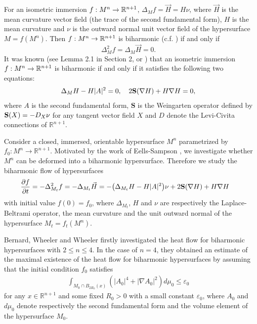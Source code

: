\documentclass{amsart}
\theoremstyle{definition}
\numberwithin{equation}{section}
\begin{document}
 For  an isometric
immersion $f: M^n\to
 \Bbb R^{n+1}$,  $ \Delta_{M} f=\vec H=H \nu$, where $\vec H$ is  the mean curvature vector field (the trace  of the second fundamental form),
 $H$ is the mean curvature and  $\nu$ is the outward normal  unit vector  field
of the hypersurface $M=f(M^n)$. Then  $f:
M^n\rightarrow \Bbb R^{n+1}$ is   biharmonic (c.f. \cite{Chen1991})  if and only if
\begin{equation}\label{Bi Map2}
\Delta_{M}^2f=\Delta_{M} \vec{H}=0.
\end{equation}
 It was known (see Lemma 2.1 in Section 2, or \cite{Chen1991}) that
	an isometric immersion $f: M^n\rightarrow \Bbb R^{n+1}$ is biharmonic if and only if it
	 satisfies the following two equations:
	\begin{equation} \label{biharmonic condition11}
	 \Delta_{M} H-H   |A|^2 =0, \quad
	2{\bf S}(\nabla H)+ H\nabla H=0,
 \end{equation}
where $A$ is the second fundamental form, ${\textbf{S} }$ is the   Weingarten operator defined by ${\bf S}(X)=-D_X\nu$ for any tangent vector field $X$ and $D$ denote the Levi-Civita
connections of $\mathbb R^{n+1}$.

Consider a closed,  immersed,  orientable hypersurface $M^n$
parametrized by $f_{0} : M^n\rightarrow \mathbb{R}^{n+1}$.
Motivated by the work of Eells-Sampson  \cite{ES}, we investigate whether $M^n$ can be deformed into a biharmonic hypersurface.
Therefore  we study the
  biharmonic flow of hypersurfaces
\begin{align} \label{E:theflow}
  &\frac{\partial f}{\partial t} =-\Delta_{M_t}^2 f=-\Delta_{M_t} {\vec{H}}= -\big(\Delta_{M_t}
H-H\vert A\vert ^2\big)\nu +2{\bf S}(\nabla
  H)+  H\nabla H
\end{align}
with initial value $f \left(  0 \right)=f_{0}$, where $\Delta_{M_t}$, $H$ and $\nu$ are respectively the Laplace-Beltrami
operator, the mean curvature and the  unit outward normal of the hypersurface
$M_{t} = f_{t} \left( M^n \right)$.



 Bernard,   Wheeler and  Wheeler \cite{BWW}  firstly investigated the heat  flow for biharmonic hypersurfaces with $2\leq n\leq 4$.
 In the case of $n=4$, they    obtained an estimate of the maximal existence of the heat  flow for biharmonic hypersurfaces by assuming
that the initial condition $f_0$ satisfies
 \begin{align} \label{Ad}\int_{M_0\cap B_{2R_0}\left( x \right)} (\left| A_{0} \right|^{4} +|\nabla A_0|^2 )d\mu_{0} \leq
 \varepsilon_{0} \end{align}
 for any $x\in \mathbb{R}^{n+1}$ and some fixed  $R_0>0$ with a small constant $\varepsilon_{0}$, where $A_0$ and $d\mu_0$ denote respectively the  second fundamental form  and the volume element of the  hypersurface $M_0$.
\end{document}
